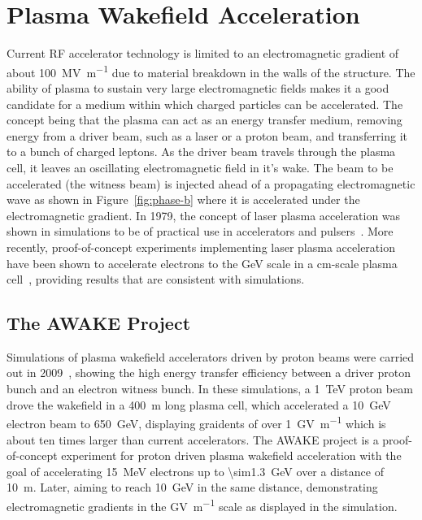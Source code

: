 
\section{Plasma Wakefield Acceleration}

Current RF accelerator technology is limited to an electromagnetic gradient of
about \SI{100}{\mega\volt\per\meter} due to material breakdown in the
walls of the structure.  The ability of plasma to sustain very large
electromagnetic fields makes it a good candidate for a medium within which
charged particles can be accelerated. The concept being that the plasma can act
as an energy transfer medium, removing energy from a driver beam, such as a
laser or a proton beam, and transferring it to a bunch of charged leptons.  As
the driver beam travels through the plasma cell, it leaves an oscillating
electromagnetic field in it's wake. The beam to be accelerated (the witness
beam) is injected ahead of a propagating electromagnetic wave as shown in
Figure~\ref{fig:phase-b} where it is accelerated under the electromagnetic
gradient.  In 1979, the concept of laser plasma acceleration was shown in
simulations to be of practical use in accelerators and
pulsers~\cite{Tajima:1979bn}. More recently, proof-of-concept experiments
implementing laser plasma acceleration have been shown to accelerate electrons
to the \si{\giga\electronvolt} scale in a \si{\centi\metre}-scale plasma
cell~\cite{Lu:2006nz,Leemans:2006dx}, providing results that are consistent with
simulations.


\subsection{The AWAKE Project}

Simulations of plasma wakefield accelerators driven by proton beams were
carried out in \num{2009}~\cite{Caldwell2008ak}, showing the high energy transfer
efficiency between a driver proton bunch and an electron witness bunch. In these
simulations, a \SI{1}{\tera\electronvolt} proton beam drove the wakefield in a
\SI{400}{\meter} long plasma cell, which accelerated a
\SI{10}{\giga\electronvolt} electron beam to \SI{650}{\giga\electronvolt},
displaying graidents of over \SI{1}{\giga\volt\per\meter} which is about ten
times larger than current accelerators.  The
AWAKE project is a proof-of-concept experiment for proton driven plasma
wakefield acceleration with the goal of accelerating \SI{15}{\mega\electronvolt}
electrons up to \SI{\sim1.3}{\giga\electronvolt} over a distance of
\SI{10}{\meter}. Later, aiming to reach \SI{10}{\giga\electronvolt} in the same
distance, demonstrating electromagnetic gradients in the
\si{\giga\volt\per\meter} scale as displayed in the simulation.

